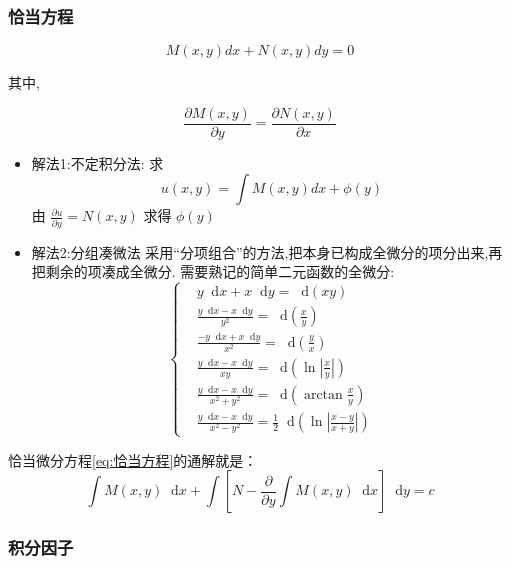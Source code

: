 \documentclass{ctexart}
\newcommand*{\dif}{\mathop{}\!\mathrm{d}}
\numberwithin{equation}{subsection}
\begin{document}
\subsubsection{恰当方程}
\begin{equation}  
        \label{eq:恰当方程}
        M(x,y)dx + N(x,y)dy = 0
\end{equation}

其中,

\[\frac{{\partial M(x,y)}}{{\partial y}} = \frac{{\partial N(x,y)}}{{\partial x}} \]

 
\begin{itemize}
\item 解法1:不定积分法:
\textcolor[rgb]{1,0,0}{求\[u(x,y) = \int {M(x,y)dx + \phi (y)} \]
由 $\frac{{\partial u}}{{\partial y}} = N(x,y)$ 求得 $\phi (y)$}
\item 解法2:分组凑微法
        采用``分项组合''的方法,把本身已构成全微分的项分出来,再把剩余的项凑成全微分.
需要熟记的简单二元函数的全微分:
\begin{equation}
\label{eq:二元函数的全微分}
\left\{
\begin{aligned}
        &y\dif x + x\dif y = \dif (xy)\\
        &\frac{{y\dif x - x\dif y}}{{{y^2}}} = \dif \left(\frac{x}{y}\right)\\
        &\frac{{ - y\dif x + x\dif y}}{{{x^2}}} = \dif \left(\frac{y}{x}\right)\\
        &\frac{{y\dif x - x\dif y}}{{xy}} = \dif \left(\ln |\frac{x}{y}|\right)\\
        &\frac{{y\dif x - x\dif y}}{{{x^2} + {y^2}}} = \dif \left(\arctan \frac{x}{y}\right)\\
        &\frac{{y\dif x - x\dif y}}{{{x^2} - {y^2}}}=\frac{1}{2}\dif \left(\ln \left| {\frac{{x - y}}{{x + y}}} \right|\right)
\end{aligned}\right.
\end{equation}
\end{itemize}

\textcolor[rgb]{1,0,0}{恰当微分方程\eqref{eq:恰当方程}的通解就是：
\[
\int M(x,y) \dif x+\int [N-\frac{\partial}{\partial y}\int M(x,y) \dif x]\dif y=c
\]}
\subsubsection{积分因子}
\end{document}
